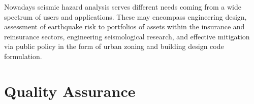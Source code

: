 Nowadays seismic hazard analysis serves different needs coming 
from a wide spectrum of users and applications. 
%
These may encompass engineering design, assessment of earthquake risk 
to portfolios of assets within the insurance and reinsurance sectors, 
engineering seismological research, and effective mitigation via public 
policy in the form of urban zoning and building design code formulation.

\section{Quality Assurance}

